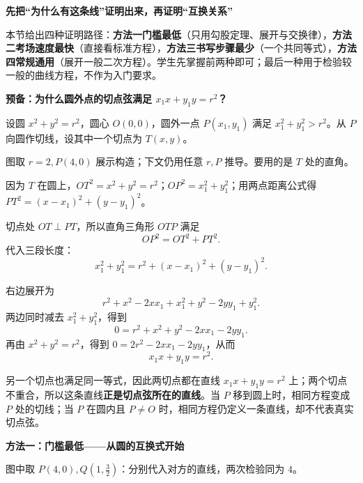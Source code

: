 \begin{proofbox}
\textbf{\textcolor{CProof}{先把“为什么有这条线”证明出来，再证明“互换关系”}}

本节给出四种证明路径：\textbf{方法一门槛最低}（只用勾股定理、展开与交换律），\textbf{方法二考场速度最快}（直接看标准方程），\textbf{方法三书写步骤最少}（一个共同等式），\textbf{方法四常规通用}（展开一般二次方程）。学生先掌握前两种即可；最后一种用于检验较一般的曲线方程，不作为入门要求。

\medskip
\textbf{\textcolor{CProof}{预备：为什么圆外点的切点弦满足 $x_1x+y_1y=r^2$？}}

设圆 $x^2+y^2=r^2$，圆心 $O(0,0)$，圆外一点 $P(x_1,y_1)$ 满足 $x_1^2+y_1^2>r^2$。从 $P$ 向圆作切线，设其中一个切点为 $T(x,y)$。

\begin{center}

\end{center}
图取 $r=2,P(4,0)$ 展示构造；下文仍用任意 $r,P$ 推导。要用的是 $T$ 处的直角。
\begin{description}[style=nextline,leftmargin=2.8em,itemsep=0.42em]
\item[\textbf{第一步：写出三条线段的长度平方。}] 因为 $T$ 在圆上，$OT^2=x^2+y^2=r^2$；$OP^2=x_1^2+y_1^2$；用两点距离公式得 $PT^2=(x-x_1)^2+(y-y_1)^2$。
\item[\textbf{第二步：使用切线与半径垂直。}] 切点处 $OT\perp PT$，所以直角三角形 $OTP$ 满足
\[
OP^2=OT^2+PT^2.
\]
代入三段长度：
\[
x_1^2+y_1^2=r^2+(x-x_1)^2+(y-y_1)^2.
\]
\item[\textbf{第三步：展开，不跳步。}] 右边展开为
\[
r^2+x^2-2xx_1+x_1^2+y^2-2yy_1+y_1^2.
\]
两边同时减去 $x_1^2+y_1^2$，得到
\[
0=r^2+x^2+y^2-2xx_1-2yy_1.
\]
再由 $x^2+y^2=r^2$，得到 $0=2r^2-2xx_1-2yy_1$，从而
\[
\boxed{x_1x+y_1y=r^2}.
\]
\item[\textbf{第四步：解释整条线。}] 另一个切点也满足同一等式，因此两切点都在直线 $x_1x+y_1y=r^2$ 上；两个切点不重合，所以这条直线\textbf{正是切点弦所在的直线}。当 $P$ 移到圆上时，相同方程变成 $P$ 处的切线；当 $P$ 在圆内且 $P\ne O$ 时，相同方程仍定义一条直线，却不代表真实切点弦。
\end{description}

\medskip
\textbf{\textcolor{CProof}{方法一：门槛最低——从圆的互换式开始}}


\begin{center}

\end{center}
图中取 $P(4,0),Q(1,\frac32)$：分别代入对方的直线，两次检验同为 $4$。


\end{proofbox}
